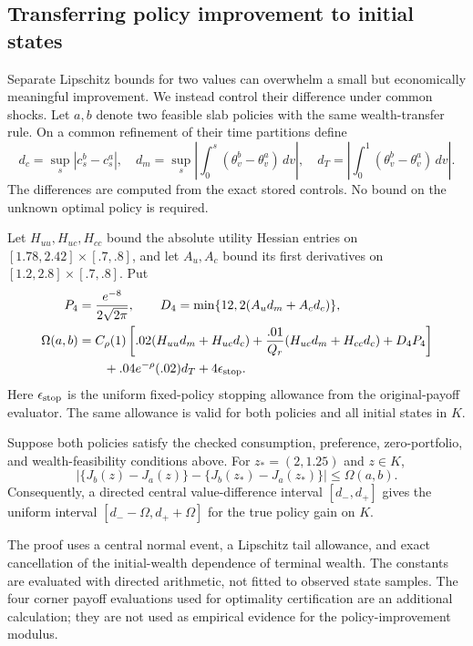\subsection{Transferring policy improvement to initial states}
Separate Lipschitz bounds for two values can overwhelm a small but economically meaningful improvement. We instead control their difference under common shocks. Let $a,b$ denote two feasible slab policies with the same wealth-transfer rule. On a common refinement of their time partitions define
\[
 d_c=\sup_s|c_s^b-c_s^a|,\quad
 d_m=\sup_s\left|\int_0^s(\theta_v^b-\theta_v^a)\,dv\right|,\quad
 d_T=\left|\int_0^1(\theta_v^b-\theta_v^a)\,dv\right|.
\]
The differences are computed from the exact stored controls. No bound on the unknown optimal policy is required.

Let $H_{uu},H_{uc},H_{cc}$ bound the absolute utility Hessian entries on $[1.78,2.42]\times[.7,.8]$, and let $A_u,A_c$ bound its first derivatives on $[1.2,2.8]\times[.7,.8]$. Put
\begin{align}
 P_4&=\frac{e^{-8}}{2\sqrt{2\pi}},\qquad
 D_4=\min\{12,2(A_ud_m+A_cd_c)\},\notag\\
 \Omega(a,b)&=C_\rho(1)\left[.02(H_{uu}d_m+H_{uc}d_c)
    +\frac{.01}{Q_r}(H_{uc}d_m+H_{cc}d_c)+D_4P_4\right]\notag\\
 &\qquad+.04e^{-\rho}(.02)d_T+4\epsilon_{\rm stop}.
 \label{eq:r19modulus}
\end{align}
Here $\epsilon_{\rm stop}$ is the uniform fixed-policy stopping allowance from the original-payoff evaluator. The same allowance is valid for both policies and all initial states in $K$.

\begin{theorem}\label{thm:r19transfer}
Suppose both policies satisfy the checked consumption, preference, zero-portfolio, and wealth-feasibility conditions above. For $z_*=(2,1.25)$ and $z\in K$,
\begin{equation}
 \left|\{J_b(z)-J_a(z)\}-\{J_b(z_*)-J_a(z_*)\}\right|
 \leq\Omega(a,b).
 \label{eq:r19transfer}
\end{equation}
Consequently, a directed central value-difference interval $[d_-,d_+]$ gives the uniform interval
$[d_--\Omega,d_++\Omega]$ for the true policy gain on $K$.
\end{theorem}
The proof uses a central normal event, a Lipschitz tail allowance, and exact cancellation of the initial-wealth dependence of terminal wealth. The constants are evaluated with directed arithmetic, not fitted to observed state samples. The four corner payoff evaluations used for optimality certification are an additional calculation; they are not used as empirical evidence for the policy-improvement modulus.
